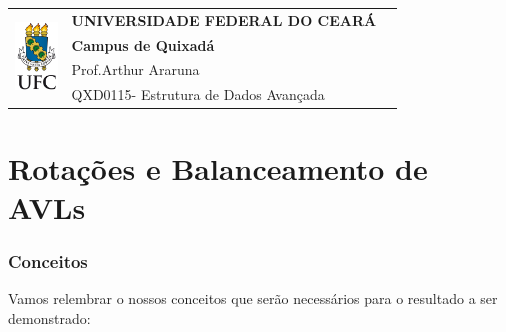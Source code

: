 \documentclass[11pt,twoside]{article}
\theoremstyle{definition}
\def\disciplinacodigotext{QXD0115}
\def\disciplinanometext{Estrutura de Dados Avançada}
\def\provatitle{Rotações e Balanceamento de AVLs}
\def\professorabbrv{Prof.}
\def\professornometext{Arthur Araruna}
\begin{document}
  \noindent
  \begin{minipage}{\textwidth}
    \begin{tabularx}{\textwidth}{cXc}
      \multirow{4}{*}{\includegraphics[height=1.8cm]{brasaoufc.pdf}} & {\bf UNIVERSIDADE FEDERAL DO CEARÁ}         & \multirow{3}{*}{} \\
                                                                     & {\bf Campus de Quixadá}                     &                   \\
                                                                     & \professorabbrv\enspace\professornometext   &                   \\
                                                                     & \disciplinacodigotext - \disciplinanometext & {}                \\
    \end{tabularx}
  \end{minipage}

  \part*{\provatitle}

    \section{Conceitos}

     Vamos relembrar o nossos conceitos que serão necessários para o resultado a ser demonstrado:
\end{document}
